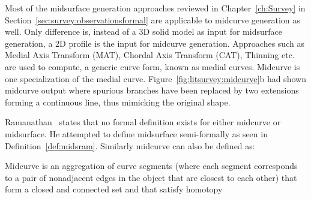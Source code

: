 
Most of the midsurface generation approaches reviewed in Chapter~\ref{ch:Survey} in Section~\ref{sec:survey:observationsformal} are applicable to midcurve generation as well. Only difference is, instead of a 3D solid model as input for midsurface generation, a 2D profile is the input for midcurve generation. Approaches such as Medial Axis Transform (MAT),  Chordal Axis Transform (CAT), Thinning etc. are used to compute, a generic curve form, known as medial curves. Midcurve is one specialization of the medial curve. Figure~\ref{fig:litsurvey:midcurve}b had shown midcurve output where spurious branches have been replaced by two extensions forming a continuous line, thus mimicking the original shape.

Ramanathan~\cite{Ramanathan2004} states that no formal definition exists for either midcurve or midsurface. He attempted to define midsurface semi-formally as seen in Definition~\ref{def:midsram}. Similarly midcurve can also be defined as:

\begin{mydef}\label{def:midcurve}
Midcurve is an aggregation of curve segments (where each segment corresponds to a pair of nonadjacent edges in the object that are closest to each other) that form a closed and connected set and that satisfy homotopy
\end{mydef}

